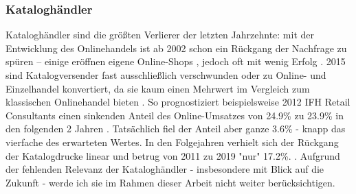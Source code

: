\documentclass[a4paper, 12pt]{scrartcl}
\makeatletter
\newenvironment{folding}{\endgroup}{\begingroup \def \@currenvir{folding}\edef \@currenvline{\on@line}}
\makeatother
\begin{document}
\begin{folding} \subsubsection{Kataloghändler}

Kataloghändler sind die größten Verlierer der letzten Jahrzehnte: mit der Entwicklung des Onlinehandels ist ab 2002 schon ein Rückgang der Nachfrage zu spüren – einige eröffnen eigene Online-Shops \cite[S. 24f]{Graf}, jedoch oft mit wenig Erfolg \cite[S. 38]{Graf}. 2015 sind Katalogversender fast ausschließlich verschwunden oder zu Online- und Einzelhandel konvertiert, da sie kaum einen Mehrwert im Vergleich zum klassischen Onlinehandel bieten \cite[S. 47]{Graf}. So prognostiziert beispielsweise 2012 IFH Retail Consultants einen sinkenden Anteil des Online-Umsatzes von 24.9\% zu 23.9\% in den folgenden 2 Jahren \cite[S. 20]{evilcom}. Tatsächlich fiel der Anteil aber ganze 3.6\% - knapp das vierfache des erwarteten Wertes. In den Folgejahren verhielt sich der Rückgang der Katalogdrucke linear und betrug von 2011 zu 2019 "nur" 17.2\%. \cite{statista-katalog}. Aufgrund der fehlenden Relevanz der Kataloghändler - insbesondere mit Blick auf die Zukunft - werde ich sie im Rahmen dieser Arbeit nicht weiter berücksichtigen. 

\end{folding}
\end{document}
